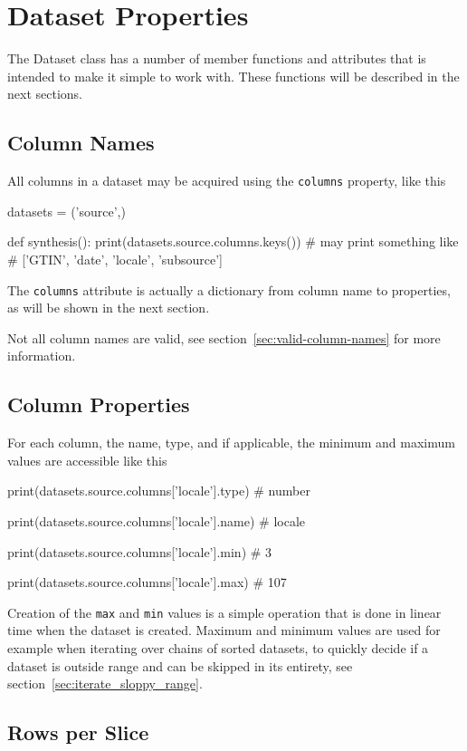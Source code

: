                       

\section{Dataset Properties}
The Dataset class has a number of member functions and attributes that
is intended to make it simple to work with.  These functions will be
described in the next sections.


\subsection{Column Names}
All columns in a dataset may be acquired using the \texttt{columns}
property, like this
\begin{python}
datasets = ('source',)

def synthesis():
  print(datasets.source.columns.keys())
  # may print something like
  # ['GTIN', 'date', 'locale', 'subsource']
\end{python}
The \texttt{columns} attribute is actually a dictionary from column
name to properties, as will be shown in the next section.

Not all column names are valid, see
section~\ref{sec:valid-column-names} for more information.

\subsection{Column Properties}
For each column, the name, type, and if applicable, the minimum and
maximum values are accessible like this
\begin{python}
print(datasets.source.columns['locale'].type)
# number

print(datasets.source.columns['locale'].name)
# locale

print(datasets.source.columns['locale'].min)
# 3

print(datasets.source.columns['locale'].max)
# 107
\end{python}
Creation of the \texttt{max} and \texttt{min} values is a simple
operation that is done in linear time when the dataset is created.
Maximum and minimum values are used for example when iterating over
chains of sorted datasets, to quickly decide if a dataset is outside
range and can be skipped in its entirety, see
section~\ref{sec:iterate_sloppy_range}.


\subsection{Rows per Slice}

